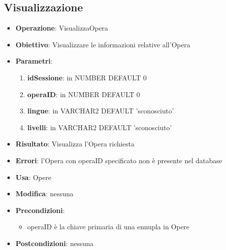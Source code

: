 \documentclass[a4paper,11pt]{article}
\begin{document}
\subsection{Visualizzazione}
\begin{itemize}
	\item \textbf{Operazione}: VisualizzaOpera
	\item \textbf{Obiettivo}: Visualizzare le informazioni relative all'Opera
	\item \textbf{Parametri}:
		\begin{enumerate}
			\item \textbf{idSessione}: in NUMBER DEFAULT 0
			\item \textbf{operaID}: in NUMBER DEFAULT 0
			\item \textbf{lingue}: in VARCHAR2 DEFAULT 'sconosciuto'
			\item \textbf{livelli}: in VARCHAR2 DEFAULT 'sconosciuto'
		\end{enumerate}
	\item \textbf{Risultato}: Visualizza l'Opera richiesta
	\item \textbf{Errori}: l'Opera con operaID specificato non è presente nel database
	\item \textbf{Usa}: Opere
	\item \textbf{Modifica}: nessuna
	\item \textbf{Precondizioni}:
		\begin{itemize}
			\item operaID è la chiave primaria di una ennupla in Opere
		\end{itemize}
	\item \textbf{Postcondizioni}: nessuna
\end{itemize}

\end{document}

